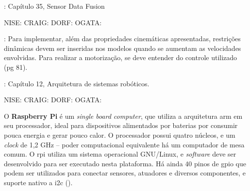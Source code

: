 \cite{siciliano2016springer}: Capítulo 35, Sensor Data Fusion

NISE:
CRAIG:
DORF:
OGATA:

\cite{siegwart2011introduction}: Para implementar, além das propriedades cinemáticas apresentadas, restrições dinâmicas devem ser inseridas nos modelos quando se aumentam as velocidades envolvidas. Para realizar a motorização, se deve entender do controle utilizado (pg 81).

\cite{siciliano2016springer}: Capítulo 12, Arquitetura de sistemas robóticos.

NISE:
CRAIG:
DORF:
OGATA:






O \textbf{Raspberry Pi} é um \emph{single board computer}, que utiliza a arquitetura \acrshort{arm} em seu processador, ideal para dispositivos alimentados por baterias por consumir pouca energia e gerar pouco calor. O processador possui quatro núcleos, e um \emph{clock} de 1,2 GHz -- poder computacional equivalente há um computador de mesa comum. O \acrshort{rpi} utiliza um sistema operacional GNU/Linux, e \emph{software} deve ser desenvolvido para ser executado nesta plataforma. Há ainda 40 pinos de \acrshort{gpio} que podem ser utilizados para conectar sensores, atuadores e diversos componentes, e suporte nativo a \acrshort{i2c} (\cite{upton2014raspberry}).

